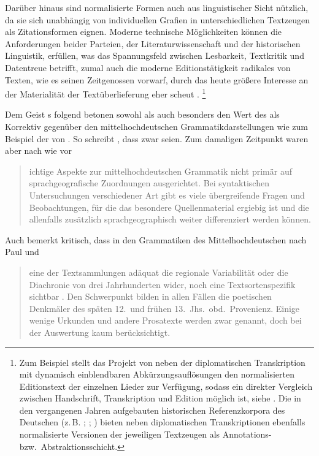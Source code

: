 Darüber hinaus sind normalisierte Formen auch aus linguistischer Sicht
nützlich, da sie sich unabhängig von individuellen Grafien in
unterschiedlichen Textzeugen als Zitations\-formen eignen. Moderne technische
Möglich\-keiten können die Anforderungen beider Parteien, der
Literaturwissenschaft und der historischen Linguistik, erfüllen, was das
Spannungsfeld zwischen Lesbarkeit, Textkritik und Datentreue betrifft, zumal
auch die moderne Editionstätigkeit radikales  von Texten, wie
\citeauthor{wilhelm1932} es seinen Zeitgenossen vorwarf, durch das heute
größere Interesse an der Materialität der Textüberlieferung eher scheut
\autocite[vgl.][1306]{wegera2000}.%
%
	\footnote{Zum Beispiel stellt das Projekt  von
	\citet{ldmdigital} neben der diplomatischen Transkription mit dynamisch
	einblendbaren Abkürzungsauflösungen den normalisierten Editionstext der
	einzelnen Lieder zur Verfügung, sodass ein direkter Vergleich zwischen
	Handschrift, Transkription und Edition möglich ist, siehe
	. Die in den vergangenen Jahren aufgebauten
	historischen Referenzkorpora des Deutschen (z.\,B.
	\cite[vgl.][522--523]{dipper2015}; \cite{rem}; \cite{ddd}) bieten neben
	diplomatischen Transkriptionen ebenfalls normalisierte Versionen der
	jeweiligen Textzeugen als Annotations- bzw.\ Abstraktionsschicht.}

Dem Geist \citeauthor{wilhelm1932}s folgend betonen sowohl \citet{deboor1976}
als auch \citet{schulze2011} besonders den Wert des \CAO{} als Korrektiv
gegenüber den mittelhochdeutschen
Grammatik\-darstel\-lungen wie zum Beispiel der von \citet{paul2007}. So
schreibt \citet[22]{schulze2011}, dass zwar  seien. Zum damaligen Zeitpunkt waren aber nach wie vor
\blockcquote[22]{schulze2011}{ichtige Aspekte zur
mittelhochdeutschen Grammatik \textelp{} nicht primär auf
sprachgeografische Zuordnungen ausgerichtet. Bei syntaktischen Untersuchungen
verschiedener Art gibt es viele übergreifende Fragen und Beobachtungen, für die
das besondere Quellenmaterial ergiebig ist und die allenfalls zusätzlich
sprachgeographisch weiter differenziert werden können.}

Auch \citet{wegera2000} bemerkt kritisch, dass in den Grammatiken des
Mittelhochdeutschen nach Paul\nocite{paul2007} und
\citeauthor{mettke1993} \blockcquote[1305]{wegera2000}{eine der
Textsammlungen adäquat die regionale Variabilität oder die Diachronie von drei
Jahrhunderten wider, noch \textelp{} eine Textsortenspezifik
sichtbar . Den Schwerpunkt bilden in allen Fällen die poetischen
Denkmäler des späten 12.\ und frühen 13.~Jhs.\ obd.\ Provenienz. Einige wenige
Urkunden und andere Prosatexte \textelp{} werden zwar genannt, doch bei der
Auswertung kaum berücksichtigt.}

